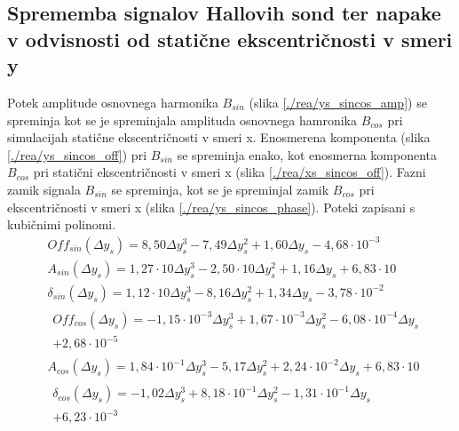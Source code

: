 \subsection{Sprememba signalov Hallovih sond ter napake v odvisnosti od statične ekscentričnosti v smeri y}
Potek amplitude osnovnega harmonika $B_{sin}$ (slika \ref{./rea/ys_sincos_amp}) se spreminja kot se je spreminjala amplituda osnovnega hamronika $B_{cos}$ pri simulacijah statične ekscentričnosti v smeri x.  Enosmerena komponenta (slika \ref{./rea/ys_sincos_off}) pri $B_{sin}$ se spreminja enako, kot enosmerna komponenta $B_{cos}$ pri statični ekscentričnosti v smeri x (slika \ref{./rea/xs_sincos_off}).  Fazni zamik signala $B_{sin}$ se spreminja, kot se je spreminjal zamik  $B_{cos}$ pri ekscentričnosti v smeri x (slika \ref{./rea/ys_sincos_phase}). Poteki zapisani s kubičnimi polinomi.
\begin{eqnarray}
&Off_{sin}(\Delta y_s) =8,50\Delta y_s^{3}-7,49\Delta y_s^{2}+1,60\Delta y_s-4,68\cdot 10^{-3} \\                                        
&A_{sin}(\Delta y_s) =1,27\cdot 10\Delta y_s^{3}-2,50\cdot 10\Delta y_s^{2}+1,16\Delta y_s+6,83\cdot 10 \\                               
&\delta_{sin}(\Delta y_s) =1,12\cdot 10\Delta y_s^{3}-8,16\Delta y_s^{2}+1,34\Delta y_s-3,78\cdot 10^{-2} \\                              
&\begin{split}Off_{cos}(\Delta y_s) =-1,15\cdot 10^{-3}\Delta y_s^{3}+1,67\cdot 10^{-3}\Delta y_s^{2}-6,08\cdot 10^{-4}\Delta y_s\\+2,68\cdot 10^{-5}\end{split} \\
&A_{cos}(\Delta y_s) =1,84\cdot 10^{-1}\Delta y_s^{3}-5,17\Delta y_s^{2}+2,24\cdot 10^{-2}\Delta y_s+6,83\cdot 10 \\                     
&\begin{split}\delta_{cos}(\Delta y_s) =-1,02\Delta y_s^{3}+8,18\cdot 10^{-1}\Delta y_s^{2}-1,31\cdot 10^{-1}\Delta y_s\\+6,23\cdot 10^{-3} \end{split}
\end{eqnarray}

